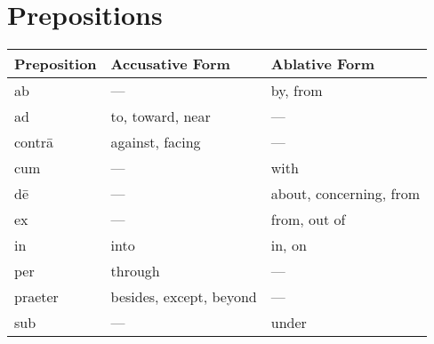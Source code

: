 \section{Prepositions}

\setlength\columnseprule{.4pt}
\renewcommand{\arraystretch}{2.5}

\vspace{3em}
\begin{tabu} to \linewidth{X[l]X[l]X[l]}\toprule
  Preposition & Accusative Form & Ablative Form \\\midrule
  ab        & ---                     & by, from \\
  ad        & to, toward, near        & --- \\
  contr\=a  & against, facing         & --- \\
  cum       & ---                     & with \\
  d\=e      & ---                     & about, concerning, from \\
  ex        & ---                     & from, out of \\
  in        & into                    & in, on \\
  per       & through                 & --- \\
  praeter   & besides, except, beyond & --- \\
  sub       & ---                     & under \\
\end{tabu}
